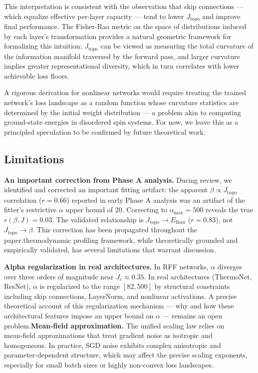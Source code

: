 \documentclass[11pt, a4paper]{article}
\theoremstyle{definition}
\begin{document}
This interpretation is consistent with the observation that skip connections — which equalize effective per-layer capacity — tend to lower $J_\mathrm{topo}$ and improve final performance. The Fisher-Rao metric on the space of distributions induced by each layer's transformation provides a natural geometric framework for formalizing this intuition: $J_\mathrm{topo}$ can be viewed as measuring the total curvature of the information manifold traversed by the forward pass, and larger curvature implies greater representational diversity, which in turn correlates with lower achievable loss floors.

A rigorous derivation for nonlinear networks would require treating the trained network's loss landscape as a random function whose curvature statistics are determined by the initial weight distribution — a problem akin to computing ground-state energies in disordered spin systems. For now, we leave this as a principled speculation to be confirmed by future theoretical work.

\subsection{Limitations}
\label{subsec:limitations}

\textbf{An important correction from Phase A analysis.} During review, we identified and corrected an important fitting artifact: the apparent $\beta \propto J_\mathrm{topo}$ correlation ($r = 0.66$) reported in early Phase A analysis was an artifact of the fitter's restrictive $\alpha$ upper bound of 20. Correcting to $\alpha_\max = 500$ reveals the true $r(\beta, J) = 0.03$. The validated relationship is $J_\mathrm{topo} \to E_\mathrm{floor}$ ($r = 0.83$), not $J_\mathrm{topo} \to \beta$. This correction has been propagated throughout the paper.\n\nThe thermodynamic profiling framework, while theoretically grounded and empirically validated, has several limitations that warrant discussion.

\textbf{Alpha regularization in real architectures.} In RFF networks, $\alpha$ diverges over three orders of magnitude near $J_c \approx 0.35$. In real architectures (ThermoNet, ResNet), $\alpha$ is regularized to the range $[82, 500]$ by structural constraints including skip connections, LayerNorm, and nonlinear activations. A precise theoretical account of this regularization mechanism — why and how these architectural features impose an upper bound on $\alpha$ — remains an open problem.\n\n\textbf{Mean‑field approximation.} The unified scaling law relies on mean‑field approximations that treat gradient noise as isotropic and homogeneous. In practice, SGD noise exhibits complex anisotropic and parameter‑dependent structure, which may affect the precise scaling exponents, especially for small batch sizes or highly non‑convex loss landscapes.
\end{document}

